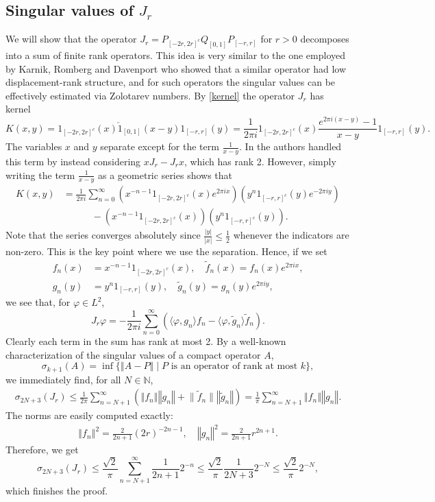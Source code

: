 \documentclass[12pt]{amsart}
\numberwithin{equation}{section}
\newcommand{\N}{\mathbb{N}}
\newcommand{\norm}[1]{\left\Vert #1 \right\Vert}
\renewcommand{\phi}{\varphi}
\begin{document}
\subsection{Singular values of $J_r$}
We will show that the operator $J_r = P_{[-2r,2r]^c} Q_{[0,1]} P_{[-r,r]}$ for $r>0$ %
decomposes into a sum of finite rank operators. This idea is very similar to the one employed by Karnik, Romberg and Davenport \cite{Karnik_Romberg_Davenport} who showed that a similar operator had low displacement-rank structure, and for such operators the singular values can be effectively estimated via Zolotarev numbers. By \eqref{kernel} the operator $J_r$ has kernel
\[
K(x,y) = 1_{[-2r,2r]^c}(x) \check{1}_{[0,1]}(x-y) 1_{[-r,r]}(y) = \frac{1}{2\pi i} 1_{[-2r,2r]^c}(x) \frac{e^{2\pi i(x-y)}-1}{x-y} 1_{[-r,r]}(y).
\]
The variables $x$ and $y$ separate except for the term $\frac{1}{x-y}$. In \cite{Karnik_Romberg_Davenport} the authors handled this term by instead considering $x J_r - J_r x$, which has rank 2. However, simply writing the term $\frac{1}{x-y}$ as a geometric series shows that
\begin{align*}
K(x,y) &= \frac{1}{2\pi i}\sum_{n=0}^\infty \left(x^{-n-1} 1_{[-2r,2r]^c}(x) e^{2\pi i x}\right) \left( y^{n} 1_{[-r,r]^c}(y) e^{-2\pi i y}\right)\\
&\quad\quad \quad -  \left(x^{-n-1} 1_{[-2r,2r]^c}(x)\right) \left( y^{n} 1_{[-r,r]^c}(y)\right).
\end{align*}
Note that the series converges absolutely since $\frac{|y|}{|x|} \leq \frac{1}{2}$ whenever the indicators are non-zero. This is the key point where we use the separation. Hence, if we set 
\begin{align*}
f_n(x) &=  x^{-n-1} 1_{[-2r,2r]^c}(x), \quad \tilde{f}_n(x) = f_n(x) e^{2\pi i x},\\
g_n(y) &=  y^{n} 1_{[-r,r]}(y), \quad \tilde{g}_n(y) = g_n(y) e^{2\pi i y},
\end{align*}
we see that, for $\phi \in L^2$,
\[
J_r \phi = -\frac{1}{2\pi i}\sum_{n=0}^\infty \left(\langle{\phi},g_n\rangle f_n - \langle \phi, \tilde{g}_n \rangle \tilde{f}_n\right).
\]
Clearly each term in the sum has rank at most 2. By a well-known characterization of the singular values of a compact operator $A$,
\[
\sigma_{k+1}(A) = \inf\{ \norm{A - P} \mid P \text{ is an operator of rank at most } k\},
\]
we immediately find, for all $N\in \N$,
\begin{align*}
\sigma_{2N+3}(J_r) \leq \frac{1}{2\pi} \sum_{n=N+1}^\infty \left(\norm{f_n} \norm{g_n} + \lVert \tilde{f}_n \rVert \norm{\tilde{g}_n}\right) = \frac{1}{\pi} \sum_{n=N+1}^\infty \norm{f_n} \norm{g_n}.
\end{align*}
The norms are easily computed exactly:
\begin{align*}
\norm{f_n}^2 = \frac{2}{2n+1} \left(2r\right)^{-2n-1}, \quad \norm{g_n}^2 = \frac{2}{2n+1} r^{2n+1}. 
\end{align*}
Therefore, we get
\[
\sigma_{2N+3}(J_r) \leq \frac{\sqrt{2}}{\pi} \sum_{n=N+1}^\infty \frac{1}{2n+1} 2^{-n} \leq \frac{\sqrt{2}}{\pi} \frac{1}{2N+3} 2^{-N} \le \frac{\sqrt{2}}{\pi}2^{-N},
\]
which finishes the proof.
\end{document}
